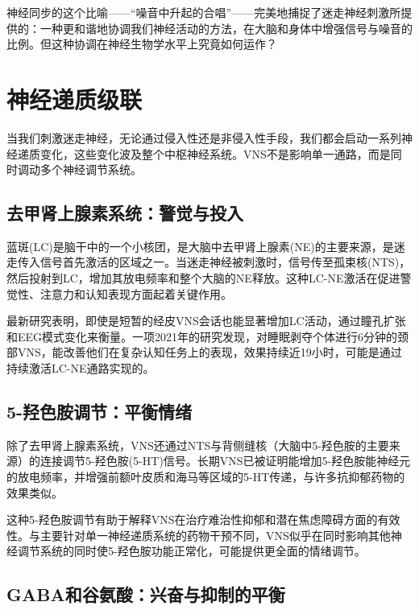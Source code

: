 \documentclass[
  Letterpaper,
]{scrbook}
\begin{document}
神经同步的这个比喻------``噪音中升起的合唱''------完美地捕捉了迷走神经刺激所提供的：一种更和谐地协调我们神经活动的方法，在大脑和身体中增强信号与噪音的比例。但这种协调在神经生物学水平上究竟如何运作？

\section{神经递质级联}\label{ux795eux7ecfux9012ux8d28ux7ea7ux8054}

当我们刺激迷走神经，无论通过侵入性还是非侵入性手段，我们都会启动一系列神经递质变化，这些变化波及整个中枢神经系统。VNS不是影响单一通路，而是同时调动多个神经调节系统。

\subsection{去甲肾上腺素系统：警觉与投入}\label{ux53bbux7532ux80beux4e0aux817aux7d20ux7cfbux7edfux8b66ux89c9ux4e0eux6295ux5165}

蓝斑(LC)是脑干中的一个小核团，是大脑中去甲肾上腺素(NE)的主要来源，是迷走传入信号首先激活的区域之一。当迷走神经被刺激时，信号传至孤束核(NTS)，然后投射到LC，增加其放电频率和整个大脑的NE释放。这种LC-NE激活在促进警觉性、注意力和认知表现方面起着关键作用。

最新研究表明，即使是短暂的经皮VNS会话也能显著增加LC活动，通过瞳孔扩张和EEG模式变化来衡量。一项2021年的研究发现，对睡眠剥夺个体进行6分钟的颈部VNS，能改善他们在复杂认知任务上的表现，效果持续近19小时，可能是通过持续激活LC-NE通路实现的。

\subsection{5-羟色胺调节：平衡情绪}\label{ux7f9fux8272ux80faux8c03ux8282ux5e73ux8861ux60c5ux7eea}

除了去甲肾上腺素系统，VNS还通过NTS与背侧缝核（大脑中5-羟色胺的主要来源）的连接调节5-羟色胺(5-HT)信号。长期VNS已被证明能增加5-羟色胺能神经元的放电频率，并增强前额叶皮质和海马等区域的5-HT传递，与许多抗抑郁药物的效果类似。

这种5-羟色胺调节有助于解释VNS在治疗难治性抑郁和潜在焦虑障碍方面的有效性。与主要针对单一神经递质系统的药物干预不同，VNS似乎在同时影响其他神经调节系统的同时使5-羟色胺功能正常化，可能提供更全面的情绪调节。

\subsection{GABA和谷氨酸：兴奋与抑制的平衡}\label{gabaux548cux8c37ux6c28ux9178ux5174ux594bux4e0eux6291ux5236ux7684ux5e73ux8861}
\end{document}
